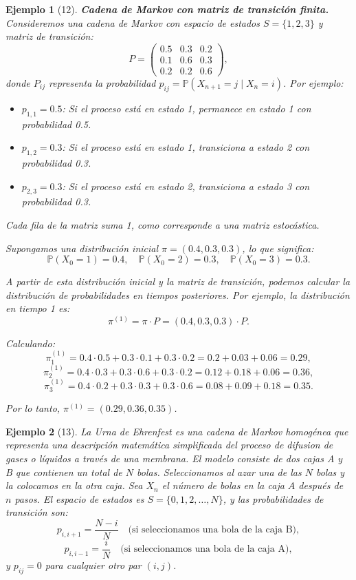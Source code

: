 \documentclass[12pt]{book}
\newtheorem{example}{Ejemplo}[chapter]
\begin{document}
\begin{example}[12]
\textbf{Cadena de Markov con matriz de transición finita.} Consideremos una cadena de Markov con espacio de estados $S = \{1, 2, 3\}$ y matriz de transición:
\[
P = \begin{pmatrix}
0.5 & 0.3 & 0.2 \\
0.1 & 0.6 & 0.3 \\
0.2 & 0.2 & 0.6
\end{pmatrix},
\]
donde $P_{ij}$ representa la probabilidad $p_{ij} = \mathbb{P}(X_{n+1} = j \mid X_n = i)$. Por ejemplo:
\begin{itemize}
    \item $p_{1,1} = 0.5$: Si el proceso está en estado 1, permanece en estado 1 con probabilidad 0.5.
    \item $p_{1,2} = 0.3$: Si el proceso está en estado 1, transiciona a estado 2 con probabilidad 0.3.
    \item $p_{2,3} = 0.3$: Si el proceso está en estado 2, transiciona a estado 3 con probabilidad 0.3.
\end{itemize}

Cada fila de la matriz suma 1, como corresponde a una matriz estocástica.

Supongamos una distribución inicial $\pi = (0.4, 0.3, 0.3)$, lo que significa:
\[
\mathbb{P}(X_0 = 1) = 0.4, \quad \mathbb{P}(X_0 = 2) = 0.3, \quad \mathbb{P}(X_0 = 3) = 0.3.
\]

A partir de esta distribución inicial y la matriz de transición, podemos calcular la distribución de probabilidades en tiempos posteriores. Por ejemplo, la distribución en tiempo 1 es:
\[
\pi^{(1)} = \pi \cdot P = (0.4, 0.3, 0.3) \cdot P.
\]

Calculando:
\[
\pi_1^{(1)} = 0.4 \cdot 0.5 + 0.3 \cdot 0.1 + 0.3 \cdot 0.2 = 0.2 + 0.03 + 0.06 = 0.29,
\]
\[
\pi_2^{(1)} = 0.4 \cdot 0.3 + 0.3 \cdot 0.6 + 0.3 \cdot 0.2 = 0.12 + 0.18 + 0.06 = 0.36,
\]
\[
\pi_3^{(1)} = 0.4 \cdot 0.2 + 0.3 \cdot 0.3 + 0.3 \cdot 0.6 = 0.08 + 0.09 + 0.18 = 0.35.
\]

Por lo tanto, $\pi^{(1)} = (0.29, 0.36, 0.35)$.
\end{example}

\begin{example}[13]
La \textit{Urna de Ehrenfest} es una cadena de Markov homogénea que representa una descripción matemática simplificada del proceso de difusion de gases o líquidos a través de una membrana. El modelo consiste de dos cajas A y B que contienen un total de $N$ bolas. Seleccionamos al azar una de las $N$ bolas y la colocamos en la otra caja. Sea $X_n$ el número de bolas en la caja $A$ después de $n$ pasos. El espacio de estados es $S = \{0, 1, 2, \ldots, N\}$, y las probabilidades de transición son:
\[
p_{i, i+1} = \frac{N - i}{N} \quad \text{(si seleccionamos una bola de la caja B)},
\]
\[p_{i, i-1} = \frac{i}{N} \quad \text{(si seleccionamos una bola de la caja A)},
\]
y $p_{ij} = 0$ para cualquier otro par $(i, j)$.
\end{example}
\end{document}
